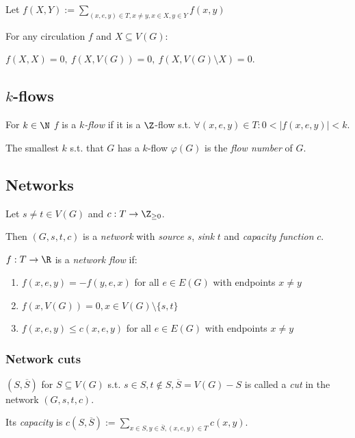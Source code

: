 Let $f(X,Y) := \sum_{(x,e,y) \in T, x \neq y, x \in X, y \in Y} f(x,y)$

\spacing

For any circulation $f$ and $X \subseteq V(G)$:

$f(X,X)=0, \ f(X,V(G))=0, \ f(X,V(G) \setminus X)=0$.

\subsection*{$k$-flows}

For $k \in \N$ $f$ is a \emph{$k$-flow} if it is a $\Z$-flow s.t. $\forall (x,e,y) \in T : 0 < |f(x,e,y)| < k$.

\spacing

The smallest $k$ s.t. that $G$ has a $k$-flow $\varphi(G)$ is the \emph{flow number} of $G$.

\subsection*{Networks}

Let $s \neq t \in V(G)$ and $c : T \to \Z_{\geq0}$.

Then $(G,s,t,c)$ is a \emph{network} with \emph{source} $s$, \emph{sink} $t$ and \emph{capacity function} $c$.

\spacing

$f : T \to \R$ is a \emph{network flow} if:

\begin{enumerate}
	\item $f(x,e,y) = -f(y,e,x)$ for all $e \in E(G)$ with endpoints $x \neq y$
	\item $f(x,V(G))=0, x \in V(G) \setminus \{s,t\}$
	\item $f(x,e,y) \leq c(x,e,y)$ for all $e \in E(G)$ with endpoints $x \neq y$
\end{enumerate}

\subsubsection*{Network cuts}

$(S,\overline S)$ for $S \subseteq V(G)$ s.t. $s \in S, t \notin S, \overline S = V(G)-S$ is called a \emph{cut} in the network $(G,s,t,c)$.

\spacing

Its \emph{capacity} is $c(S,\overline S) := \sum_{x \in S, y \in \overline S, (x,e,y) \in T} c(x,y)$.

